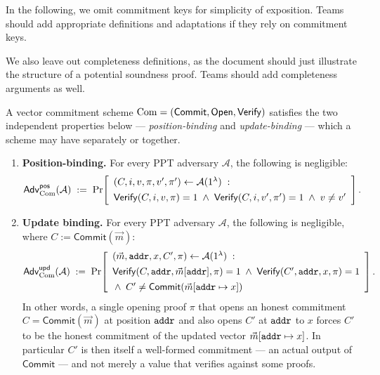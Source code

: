 \begin{instruction}
  In the following, we omit commitment keys for simplicity of exposition. Teams should add appropriate definitions and adaptations if they rely on commitment keys.
\end{instruction}

\begin{instruction}
  We also leave out completeness definitions, as the document should just illustrate the structure of a potential soundness proof. Teams should add completeness arguments as well.
\end{instruction}

\begin{definition}\label{def:binding}
A vector commitment scheme
$\mathrm{Com}=(\mathsf{Commit},\mathsf{Open},\mathsf{Verify})$
satisfies the two independent properties below --- \emph{position-binding} and
\emph{update-binding} --- which a scheme may have separately or together.
\begin{enumerate}
  \item \textbf{Position-binding.} For every PPT adversary $\mathcal{A}$, the following is negligible:
\[
  \mathsf{Adv}^{\mathsf{pos}}_{\mathrm{Com}}(\mathcal{A}) \;:=\;
  \Pr\!\left[\begin{array}{l}
    (C,i,v,\pi,v',\pi')\leftarrow\mathcal{A}(1^\lambda) \;:\; \\[4pt]
    \mathsf{Verify}(C,i,v,\pi)=1 \;\wedge\;
    \mathsf{Verify}(C,i,v',\pi')=1 \;\wedge\; v\neq v'
  \end{array}\right].
\]
  \item \textbf{Update binding.} For every PPT adversary $\mathcal{A}$, the
    following is negligible, where $C:=\mathsf{Commit}(\vec{m})$:
\[
  \mathsf{Adv}^{\mathsf{upd}}_{\mathrm{Com}}(\mathcal{A}) \;:=\;
  \Pr\!\left[\begin{array}{l}
    (\vec{m}, \mathtt{addr}, x, C', \pi) \leftarrow \mathcal{A}(1^\lambda) \;:\; \\[4pt]
    \mathsf{Verify}(C,\mathtt{addr},\vec{m}[\mathtt{addr}],\pi)=1 \;\wedge\;
    \mathsf{Verify}(C',\mathtt{addr},x,\pi)=1 \\[4pt]
    {}\wedge\; C' \neq \mathsf{Commit}(\vec{m}[\mathtt{addr}\mapsto x])
  \end{array}\right].
\]
In other words, a single opening proof $\pi$ that opens an honest commitment
$C=\mathsf{Commit}(\vec{m})$ at position $\mathtt{addr}$ and also opens $C'$ at $\mathtt{addr}$
to $x$ forces $C'$ to be the honest commitment of the updated vector
$\vec{m}[\mathtt{addr}\mapsto x]$. In particular $C'$ is then itself a well-formed
commitment --- an actual output of $\mathsf{Commit}$ --- and not merely a value
that verifies against some proofs.
\end{enumerate}
\end{definition}
